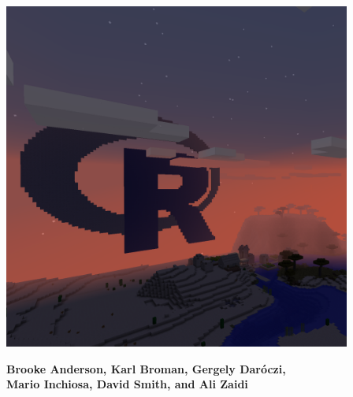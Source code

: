 \documentclass[12pt]{article}
\begin{document}
\thispagestyle{empty}


\vspace{2cm}

\centerline{\includegraphics[width=4.5in]{cover_image.png}}

\vspace{2cm}

\noindent \LARGE \textbf{Brooke Anderson, Karl Broman, Gergely Daróczi, \\[4pt]
Mario Inchiosa, David Smith, and Ali Zaidi}
\end{document}
